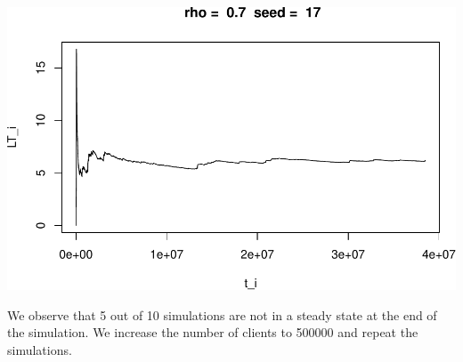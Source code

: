 \documentclass[]{article}
\begin{document}
\includegraphics{003_files/figure-latex/unnamed-chunk-17-10.pdf}

We observe that 5 out of 10 simulations are not in a steady state at the
end of the simulation. We increase the number of clients to 500000 and
repeat the simulations.
\end{document}
